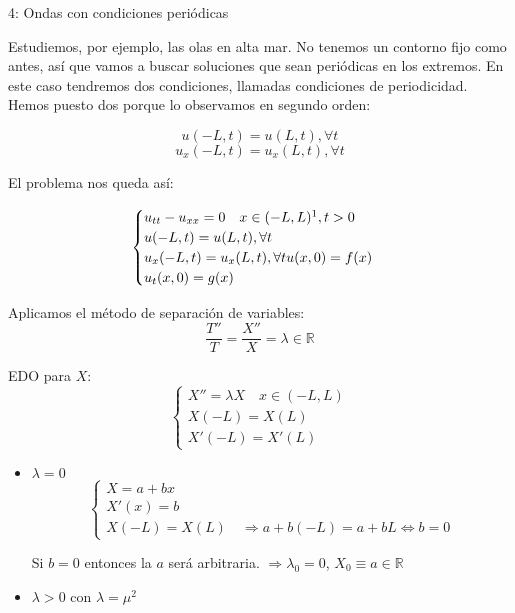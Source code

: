 
		\begin{example}{4: Ondas con condiciones periódicas}\label{ec:ondas}

			Estudiemos, por ejemplo, las olas en alta mar. No tenemos un contorno fijo como antes, así que vamos a buscar soluciones que sean periódicas en los extremos. En este caso tendremos dos condiciones, llamadas condiciones de periodicidad. Hemos puesto dos porque lo observamos en segundo orden:

			\[u(-L,t) = u(L,t), \forall t\]
			\[u_x(-L,t) = u_x(L,t), \forall t\]

			El problema nos queda así:

			\[  \begin{cases}
				u_{tt} - u_{xx} = 0 \quad x  \in (-L,L)\footnotemark, t>0\\
				u(-L,t) = u(L,t), \forall t\\
				u_x(-L,t) = u_x(L,t), \forall t
				u(x,0) = f(x) \\
				u_t(x,0) = g(x)
				\end{cases}
			\]

			Aplicamos el método de separación de variables:
			\[ \frac{T''}{T} = \frac{X''}{X} = \lambda \in \mathbb{R}\]

			EDO para $X$:
			\[\left\{\begin{array}{l}
				X'' = \lambda X \quad x \in (-L,L) \\
				X(-L) = X(L) \\
				X'(-L) = X'(L)
			\end{array}
			\right. \]

			\begin{itemize}
				\item $\lambda = 0$
					\[\left\{\begin{array}{l}
						X = a+bx \\
						X'(x) = b \\
						X(-L) = X(L) \quad \Rightarrow a + b(-L) = a + bL \Leftrightarrow b = 0
					\end{array}
					\right. \]

					Si $b = 0$ entonces la $a$ será arbitraria. $\Rightarrow \lambda_0 = 0$, $ X_0 \equiv a \in \mathbb{R}$


				\item $\lambda > 0$ con $\lambda = \mu^2$


\end{itemize}
\end{example}
